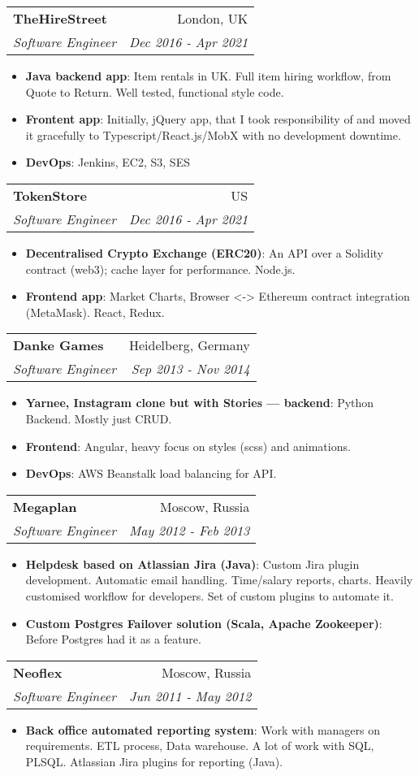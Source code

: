 \documentclass[letterpaper,11pt]{article}
\makeatletter
\newcommand{\resumeItem}[2]{
  \item\small{
    \textbf{#1}{: #2 \vspace{-2pt}}
  }
}
\newcommand{\resumeSubheading}[4]{
  \vspace{-1pt}\item
    \begin{tabular*}{0.97\textwidth}[t]{l@{\extracolsep{\fill}}r}
      \textbf{#1} & #2 \\
      \textit{\small#3} & \textit{\small #4} \\
    \end{tabular*}\vspace{-5pt}
}
\newcommand{\resumeItemListStart}{\begin{itemize}}
\newcommand{\resumeItemListEnd}{\end{itemize}\vspace{-5pt}}
\makeatother
\begin{document}
    \resumeSubheading
      {TheHireStreet}{London, UK}
      {Software Engineer}{Dec 2016 - Apr 2021}
      \resumeItemListStart
        \resumeItem{Java backend app}
          {Item rentals in UK. Full item hiring workflow, from Quote to Return. Well tested, functional style code.}
        \resumeItem{Frontent app}
          {Initially, jQuery app, that I took responsibility of and moved it gracefully to Typescript/React.js/MobX with no development downtime.}
        \resumeItem{DevOps}
          {Jenkins, EC2, S3, SES}
      \resumeItemListEnd

    \resumeSubheading
      {TokenStore}{US}
      {Software Engineer}{Dec 2016 - Apr 2021}
      \resumeItemListStart
        \resumeItem{Decentralised Crypto Exchange (ERC20)}
          {An API over a Solidity contract (web3); cache layer for performance. Node.js.}
        \resumeItem{Frontend app}
          {Market Charts, Browser <-> Ethereum contract integration (MetaMask). React, Redux.}
      \resumeItemListEnd

    \resumeSubheading
      {Danke Games}{Heidelberg, Germany}
      {Software Engineer}{Sep 2013 - Nov 2014}
      \resumeItemListStart
        \resumeItem{Yarnee, Instagram clone but with Stories — backend}
          {Python Backend. Mostly just CRUD.}
        \resumeItem{Frontend}
          {Angular, heavy focus on styles (scss) and animations.}
        \resumeItem{DevOps}
          {AWS Beanstalk load balancing for API.}
      \resumeItemListEnd

    \resumeSubheading
      {Megaplan}{Moscow, Russia}
      {Software Engineer}{May 2012 - Feb 2013}
      \resumeItemListStart
        \resumeItem{Helpdesk based on Atlassian Jira (Java)}
          {Custom Jira plugin development. Automatic email handling. Time/salary reports, charts. Heavily customised workflow for developers. Set of custom plugins to automate it.}
        \resumeItem{Custom Postgres Failover solution (Scala, Apache Zookeeper)}
          {Before Postgres had it as a feature.}
      \resumeItemListEnd

    \resumeSubheading
      {Neoflex}{Moscow, Russia}
      {Software Engineer}{Jun 2011 - May 2012}
      \resumeItemListStart
        \resumeItem{Back office automated reporting system}
          {Work with managers on requirements. ETL process, Data warehouse. A lot of work with SQL, PLSQL. Atlassian Jira plugins for reporting (Java).}
      \resumeItemListEnd

\end{document}
